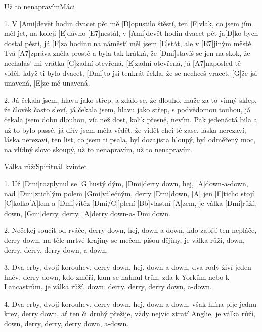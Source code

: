 \begin{song}{Už to nenapravím}{Máci}

\begin{xverse}{1. }
V [Ami]devět hodin dvacet pět mě [D]opustilo štěstí,
ten [F]vlak, co jsem jím měl jet, na koleji [E]dávno [E7]nestál,
v [Ami]devět hodin dvacet pět ja[D]ko bych dostal pěstí,
já [F]za hodinu na náměstí měl jsem [E]stát, ale v [E7]jiným městě.
Tvá [A7]zpráva zněla prostě a byla tak krátká,
že [Dmi]stavíš se jen na skok, že nechalas' mi vrátka
[G]zadní otevřená, [E]zadní otevřená,
já [A7]naposled tě viděl, když ti bylo dvacet,
[Dmi]to jsi tenkrát řekla, že se nechceš vracet,
[G]{že} jsi unavená, [E]ze mě unavená.
\end{xverse}

\begin{xverse}{2. }
Já čekala jsem, hlavu jako střep, a zdálo se, že dlouho,
může za to vinný sklep, že člověk často sleví,
já čekala jsem, hlavu jako střep, s podvědomou touhou,
já čekala jsem dobu dlouhou, víc než dost, kolik přesně, nevím.
Pak jedenáctá bila a už to bylo passé,
já dřív jsem měla vědět, že vidět chci tě zase,
láska nerezaví, láska nerezaví,
ten list, co jsem ti psala, byl dozajista hloupý,
byl odměřený moc, na vlídný slovo skoupý,
už to nenapravím, už to nenapravím.
\end{xverse}

\end{song}

\begin{song}{Válka růží}{Spirituál kvintet}

\begin{xverse}{1. }
Už [Dmi]rozplynul se [G]hustý dým, [Dmi]derry down, hej, [A]down-a-down,
nad [Dmi]ztichlým polem [Gmi]válečným, derry [Dmi]down, [A]{}
jen [F]ticho stojí [C]kolko[A]lem a [Dmi]vítěz [Dmi/C|]{plení} [Bb]vlastní [A]zem,
je válka [Dmi]růží, down, [Gmi]derry, derry, [A]derry down-a-[Dmi]down.
\end{xverse}


\begin{xverse}{2. }
Nečekej soucit od rváče, derry down, hej, down-a-down,
kdo zabíjí ten nepláče, derry down,
na těle mrtvé krajiny se mečem píšou dějiny,
je válka růží, down, derry, derry, derry down, a-down.
\end{xverse}


\begin{xverse}{3. }
Dva erby, dvojí korouhev, derry down, hej, down-a-down,
dva rody živí jeden hněv, derry down,
kdo změří, kam se nahnul trůn, zda k Yorkům nebo k Lancastrům,
je válka růží, down, derry, derry, derry down, a-down.
\end{xverse}


\begin{xverse}{4. }
Dva erby, dvojí korouhev, derry down, hej, down-a-down,
však hlína pije jednu krev, derry down,
ať ten či druhý přežije, vždy nejvíc ztratí Anglie,
je válka růží, down, derry, derry, derry down, a-down.
\end{xverse}

\end{song}
\chords{ \chordDmiC }

